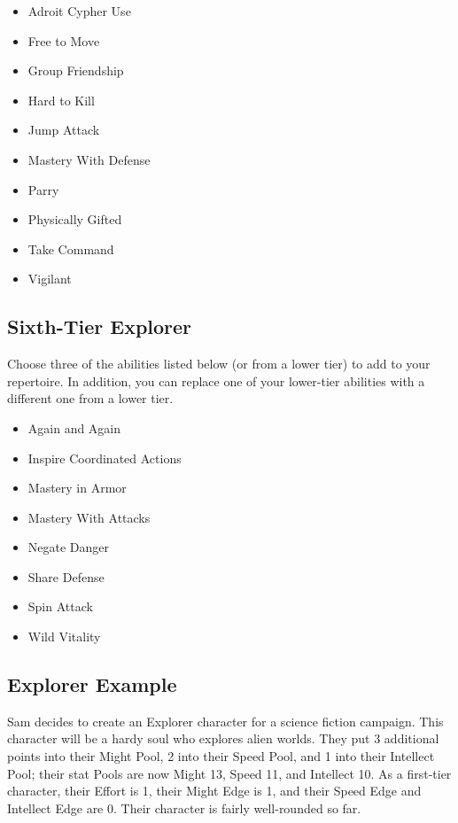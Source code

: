 \begin{multicols}{2}
\begin{itemize}
\item Adroit Cypher Use
\item Free to Move
\item Group Friendship
\item Hard to Kill
\item Jump Attack
\item Mastery With Defense
\item Parry
\item Physically Gifted
\item Take Command
\item Vigilant
\end{itemize}

\subsection{Sixth-Tier Explorer}

Choose three of the abilities listed below (or from a lower tier) to add to your repertoire. In addition, you can replace one of your lower-tier abilities with a different one from a lower tier.

\begin{itemize}
\item Again and Again
\item Inspire Coordinated Actions
\item Mastery in Armor
\item Mastery With Attacks
\item Negate Danger
\item Share Defense
\item Spin Attack
\item Wild Vitality
\end{itemize}

\subsection{Explorer Example}

Sam decides to create an Explorer character for a science fiction campaign. This character will be a hardy soul who explores alien worlds. They put 3 additional points into their Might Pool, 2 into their Speed Pool, and 1 into their Intellect Pool; their stat Pools are now Might 13, Speed 11, and Intellect 10. As a first-tier character, their Effort is 1, their Might Edge is 1, and their Speed Edge and Intellect Edge are 0. Their character is fairly well-rounded so far.


\end{multicols}
